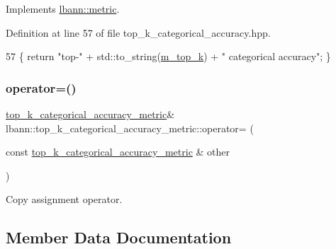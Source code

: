 Implements \hyperlink{classlbann_1_1metric_af455d7b6874d3491bc04f0f2ebfcab51}{lbann\+::metric}.



Definition at line 57 of file top\+\_\+k\+\_\+categorical\+\_\+accuracy.\+hpp.


\begin{DoxyCode}
57 \{ \textcolor{keywordflow}{return} \textcolor{stringliteral}{"top-"} + std::to\_string(\hyperlink{classlbann_1_1top__k__categorical__accuracy__metric_a6cc172f6799bffac44de06d0657efdeb}{m\_top\_k}) +  \textcolor{stringliteral}{" categorical accuracy"}; \}
\end{DoxyCode}
\mbox{\label{classlbann_1_1top__k__categorical__accuracy__metric_a2036cad8a7f9cb7490bf0341de0d70eb}} 
\subsubsection{\texorpdfstring{operator=()}{operator=()}}
{\footnotesize\ttfamily \hyperlink{classlbann_1_1top__k__categorical__accuracy__metric}{top\+\_\+k\+\_\+categorical\+\_\+accuracy\+\_\+metric}\& lbann\+::top\+\_\+k\+\_\+categorical\+\_\+accuracy\+\_\+metric\+::operator= (\begin{DoxyParamCaption}\item[{const \hyperlink{classlbann_1_1top__k__categorical__accuracy__metric}{top\+\_\+k\+\_\+categorical\+\_\+accuracy\+\_\+metric} \&}]{other }\end{DoxyParamCaption})\hspace{0.3cm}{\ttfamily [default]}}

Copy assignment operator. 

\subsection{Member Data Documentation}
\mbox{\label{classlbann_1_1top__k__categorical__accuracy__metric_a6cc172f6799bffac44de06d0657efdeb}} 
